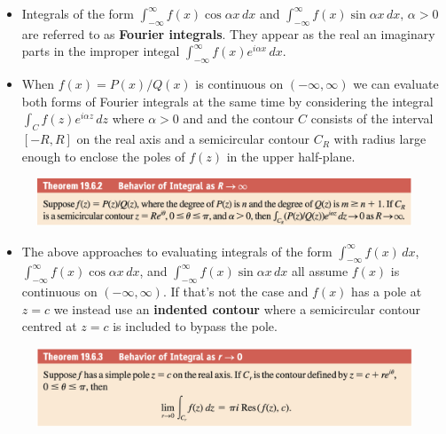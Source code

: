 \documentclass{article}
\begin{document}
\begin{itemize}
  \item Integrals of the form $\int_{-\infty}^\infty f(x) \cos \alpha x \,d x$ and $\int_{-\infty}^\infty f(x) \sin \alpha x \,d x, \,\alpha > 0$ are referred to as \textbf{Fourier integrals}. They appear as the real an imaginary parts in the improper integal $\int_{-\infty}^\infty f(x) e^{i \alpha x} \,d x$.

  \item When $f(x) = P(x) / Q(x)$ is continuous on $(-\infty, \infty)$ we can evaluate both forms of Fourier integrals at the same time by considering the integral $\int_C f(z) e^{i \alpha z} \,d z$ where $\alpha > 0$ and and the contour $C$ consists of the interval $[-R, R]$ on the real axis and a semicircular contour $C_R$ with radius large enough to enclose the poles of $f(z)$ in the upper half-plane.
\end{itemize}

\begin{figure}[H]
  \centering
  \includegraphics[width=\textwidth]{theorem-19.6.2}
\end{figure}

\begin{itemize}
  \item The above approaches to evaluating integrals of the form $\int_{-\infty}^\infty f(x) \,d x$, $\int_{-\infty}^\infty f(x) \cos \alpha x \,d x$, and $\int_{-\infty}^\infty f(x) \sin \alpha x \,d x$ all assume $f(x)$ is continuous on $(-\infty, \infty)$. If that's not the case and $f(x)$ has a pole at $z = c$ we instead use an \textbf{indented contour} where a semicircular contour centred at $z = c$ is included to bypass the pole.
\end{itemize}

\begin{figure}[H]
  \centering
  \includegraphics[width=\textwidth]{theorem-19.6.3}
\end{figure}
\end{document}
